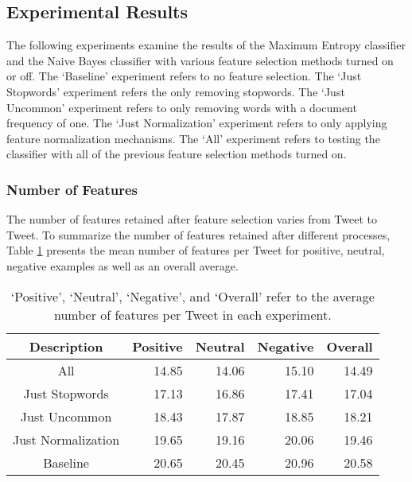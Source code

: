 \documentclass[final,3p,12pt]{elsarticle}
\begin{document}
\subsection{Experimental Results}
\label{ssection:results}

The following experiments examine the results of the Maximum Entropy classifier
and the Naive Bayes classifier with various feature selection methods turned on
or off. The `Baseline' experiment refers to no feature selection. The `Just
Stopwords' experiment refers the only removing stopwords. The `Just Uncommon'
experiment refers to only removing words with a document frequency of one. The
`Just Normalization' experiment refers to only applying feature normalization
mechanisms. The `All' experiment refers to testing the classifier with all of
the previous feature selection methods turned on.

\subsubsection{Number of Features}
\label{ssection:numfeatures}

The number of features retained after feature selection varies from Tweet to Tweet.
To summarize the number of features retained after different processes, Table
\ref{table:numfeatures} presents the mean number of features per Tweet for
positive, neutral, negative examples as well as an overall average.

\begin{table}[H]
    \begin{center}
    \begin{tabular}{|c||r|r|r|r|}
        \hline
        Description        & Positive & Neutral & Negative & Overall \\
        \hline
        All                & 14.85    & 14.06   & 15.10    & 14.49 \\
        Just Stopwords     & 17.13    & 16.86   & 17.41    & 17.04 \\
        Just Uncommon      & 18.43    & 17.87   & 18.85    & 18.21 \\
        Just Normalization & 19.65    & 19.16   & 20.06    & 19.46 \\
        Baseline           & 20.65    & 20.45   & 20.96    & 20.58 \\
        \hline
    \end{tabular}
    \end{center}
    \caption{`Positive', `Neutral', `Negative', and `Overall' refer to the
    average number of features per Tweet in each experiment.}
    \label{table:numfeatures}
\end{table}
\end{document}
